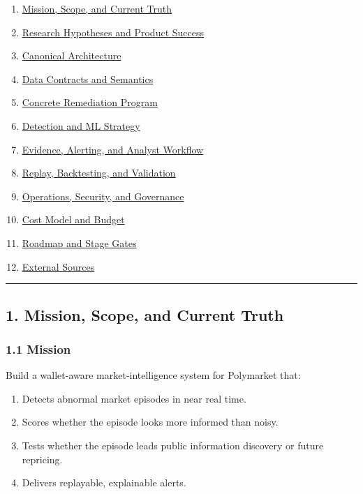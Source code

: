 \documentclass[
]{article}
\providecommand{\tightlist}{%
  \setlength{\itemsep}{0pt}\setlength{\parskip}{0pt}}
\begin{document}
\begin{enumerate}
\def\labelenumi{\arabic{enumi}.}
\tightlist
\item
  \hyperref[1-mission-scope-and-current-truth]{Mission, Scope, and
  Current Truth}
\item
  \hyperref[2-research-hypotheses-and-product-success]{Research
  Hypotheses and Product Success}
\item
  \hyperref[3-canonical-architecture]{Canonical Architecture}
\item
  \hyperref[4-data-contracts-and-semantics]{Data Contracts and
  Semantics}
\item
  \hyperref[5-concrete-remediation-program]{Concrete Remediation
  Program}
\item
  \hyperref[6-detection-and-ml-strategy]{Detection and ML Strategy}
\item
  \hyperref[7-evidence-alerting-and-analyst-workflow]{Evidence,
  Alerting, and Analyst Workflow}
\item
  \hyperref[8-replay-backtesting-and-validation]{Replay, Backtesting,
  and Validation}
\item
  \hyperref[9-operations-security-and-governance]{Operations, Security,
  and Governance}
\item
  \hyperref[10-cost-model-and-budget]{Cost Model and Budget}
\item
  \hyperref[11-roadmap-and-stage-gates]{Roadmap and Stage Gates}
\item
  \hyperref[12-external-sources]{External Sources}
\end{enumerate}

\begin{center}\rule{0.5\linewidth}{0.5pt}\end{center}

\subsection{1. Mission, Scope, and Current
Truth}\label{1-mission-scope-and-current-truth}

\subsubsection{1.1 Mission}\label{11-mission}

Build a wallet-aware market-intelligence system for Polymarket that:

\begin{enumerate}
\def\labelenumi{\arabic{enumi}.}
\tightlist
\item
  Detects abnormal market episodes in near real time.
\item
  Scores whether the episode looks more informed than noisy.
\item
  Tests whether the episode leads public information discovery or future
  repricing.
\item
  Delivers replayable, explainable alerts.
\end{enumerate}
\end{document}

